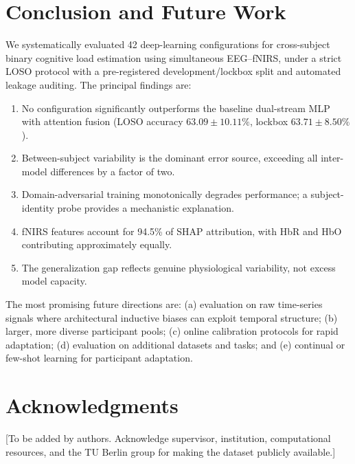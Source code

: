 \documentclass[conference]{IEEEtran}
\begin{document}
\section{Conclusion and Future Work}

We systematically evaluated 42 deep-learning configurations for cross-subject binary cognitive load estimation using simultaneous EEG--fNIRS, under a strict LOSO protocol with a pre-registered development/lockbox split and automated leakage auditing. The principal findings are:

\begin{enumerate}
    \item No configuration significantly outperforms the baseline dual-stream MLP with attention fusion (LOSO accuracy $63.09 \pm 10.11\%$, lockbox $63.71 \pm 8.50\%$).
    \item Between-subject variability is the dominant error source, exceeding all inter-model differences by a factor of two.
    \item Domain-adversarial training monotonically degrades performance; a subject-identity probe provides a mechanistic explanation.
    \item fNIRS features account for 94.5\% of SHAP attribution, with HbR and HbO contributing approximately equally.
    \item The generalization gap reflects genuine physiological variability, not excess model capacity.
\end{enumerate}

The most promising future directions are: (a) evaluation on raw time-series signals where architectural inductive biases can exploit temporal structure; (b) larger, more diverse participant pools; (c) online calibration protocols for rapid adaptation; (d) evaluation on additional datasets and tasks; and (e) continual or few-shot learning for participant adaptation.

\section*{Acknowledgments}
[To be added by authors. Acknowledge supervisor, institution, computational resources, and the TU Berlin group for making the dataset publicly available.]
\end{document}
